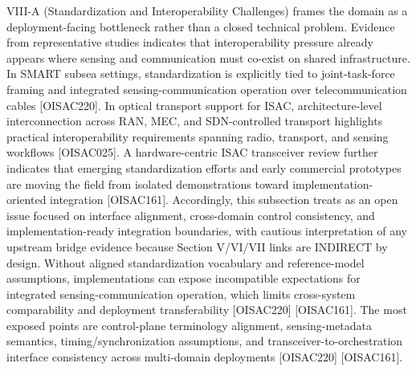 {}VIII-A (Standardization and Interoperability Challenges) frames the  domain as a deployment-facing bottleneck rather than a closed technical problem. Evidence from representative studies indicates that interoperability pressure already appears where sensing and communication must co-exist on shared infrastructure. In SMART subsea settings, standardization is explicitly tied to joint-task-force framing and integrated sensing-communication operation over telecommunication cables [O\markdownRendererUnderscore{}ISAC\markdownRendererUnderscore{}220]. In optical transport support for ISAC, architecture-level interconnection across RAN, MEC, and SDN-controlled transport highlights practical interoperability requirements spanning radio, transport, and sensing workflows [O\markdownRendererUnderscore{}ISAC\markdownRendererUnderscore{}025]. A hardware-centric ISAC transceiver review further indicates that emerging standardization efforts and early commercial prototypes are moving the field from isolated demonstrations toward implementation-oriented integration [O\markdownRendererUnderscore{}ISAC\markdownRendererUnderscore{}161]. Accordingly, this subsection treats  as an open issue focused on interface alignment, cross-domain control consistency, and implementation-ready integration boundaries, with cautious interpretation of any upstream bridge evidence because Section V/VI/VII links are INDIRECT by design.\markdownRendererInterblockSeparator
{}
\markdownRendererSectionEnd \markdownRendererSectionBegin
{}\markdownRendererInterblockSeparator
{} Without aligned standardization vocabulary and reference-model assumptions, implementations can expose incompatible expectations for integrated sensing-communication operation, which limits cross-system comparability and deployment transferability [O\markdownRendererUnderscore{}ISAC\markdownRendererUnderscore{}220] [O\markdownRendererUnderscore{}ISAC\markdownRendererUnderscore{}161].\markdownRendererParagraphSeparator
{} The most exposed points are control-plane terminology alignment, sensing-metadata semantics, timing/synchronization assumptions, and transceiver-to-orchestration interface consistency across multi-domain deployments [O\markdownRendererUnderscore{}ISAC\markdownRendererUnderscore{}220] [O\markdownRendererUnderscore{}ISAC\markdownRendererUnderscore{}161].\markdownRendererParagraphSeparator
